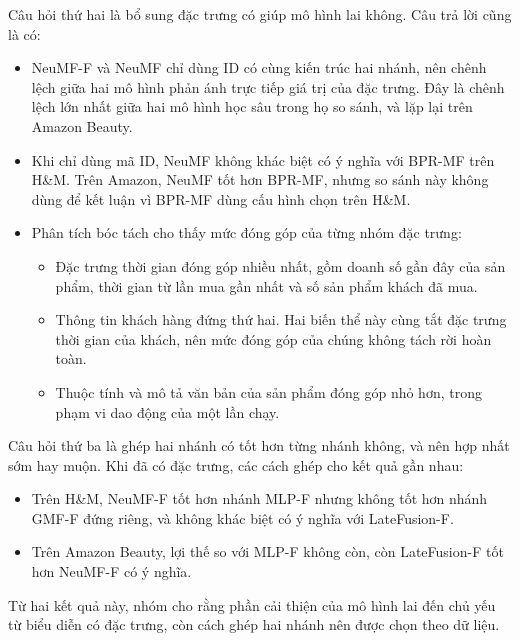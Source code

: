 Câu hỏi thứ hai là bổ sung đặc trưng có giúp mô hình lai không. Câu trả lời cũng là có:
\begin{itemize}
    \item NeuMF-F và NeuMF chỉ dùng ID có cùng kiến trúc hai nhánh, nên chênh lệch giữa hai mô hình phản ánh trực tiếp giá trị của đặc trưng. Đây là chênh lệch lớn nhất giữa hai mô hình học sâu trong họ so sánh, và lặp lại trên Amazon Beauty.
    \item Khi chỉ dùng mã ID, NeuMF không khác biệt có ý nghĩa với BPR-MF trên H\&M. Trên Amazon, NeuMF tốt hơn BPR-MF, nhưng so sánh này không dùng để kết luận vì BPR-MF dùng cấu hình chọn trên H\&M.
    \item Phân tích bóc tách cho thấy mức đóng góp của từng nhóm đặc trưng:
    \begin{itemize}
        \item Đặc trưng thời gian đóng góp nhiều nhất, gồm doanh số gần đây của sản phẩm, thời gian từ lần mua gần nhất và số sản phẩm khách đã mua.
        \item Thông tin khách hàng đứng thứ hai. Hai biến thể này cùng tắt đặc trưng thời gian của khách, nên mức đóng góp của chúng không tách rời hoàn toàn.
        \item Thuộc tính và mô tả văn bản của sản phẩm đóng góp nhỏ hơn, trong phạm vi dao động của một lần chạy.
    \end{itemize}
\end{itemize}

Câu hỏi thứ ba là ghép hai nhánh có tốt hơn từng nhánh không, và nên hợp nhất sớm hay muộn. Khi đã có đặc trưng, các cách ghép cho kết quả gần nhau:
\begin{itemize}
    \item Trên H\&M, NeuMF-F tốt hơn nhánh MLP-F nhưng không tốt hơn nhánh GMF-F đứng riêng, và không khác biệt có ý nghĩa với LateFusion-F.
    \item Trên Amazon Beauty, lợi thế so với MLP-F không còn, còn LateFusion-F tốt hơn NeuMF-F có ý nghĩa.
\end{itemize}

Từ hai kết quả này, nhóm cho rằng phần cải thiện của mô hình lai đến chủ yếu từ biểu diễn có đặc trưng, còn cách ghép hai nhánh nên được chọn theo dữ liệu.


